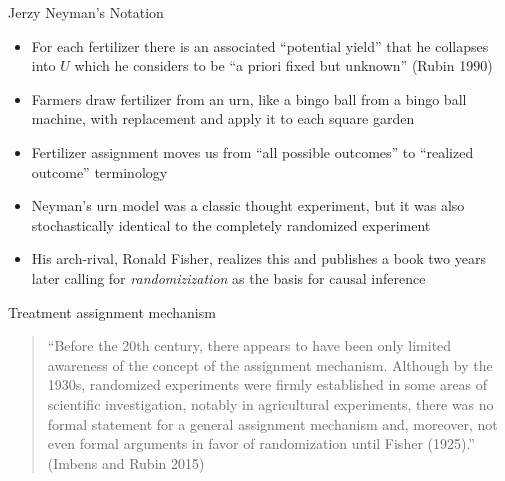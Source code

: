 \documentclass{beamer}
\begin{document}
\begin{frame}{Jerzy Neyman's Notation}

\begin{itemize}

\item For each fertilizer there is an associated ``potential yield'' that he collapses into $U$ which he considers to be ``a priori fixed but unknown'' (Rubin 1990)
\item Farmers draw fertilizer from an urn, like a bingo ball from a bingo ball machine, with replacement and apply it to each square garden
\item Fertilizer assignment moves us from ``all possible outcomes'' to ``realized outcome'' terminology
\item Neyman's urn model was a classic thought experiment, but it was also stochastically identical to the completely randomized experiment
\item His arch-rival, Ronald Fisher, realizes this and publishes a book two years later calling for \emph{randomizization} as the basis for causal inference
\end{itemize}

\end{frame}

\begin{frame}{Treatment assignment mechanism}

\begin{quote}

``Before the 20th century, there appears to have been only limited awareness of the concept of the assignment mechanism.  Although by the 1930s, randomized experiments were firmly established in some areas of scientific investigation, notably in agricultural experiments, there was no formal statement for a general assignment mechanism and, moreover, not even formal arguments in favor of randomization until Fisher (1925).'' (Imbens and Rubin 2015)

\end{quote}

\end{frame}
\end{document}
